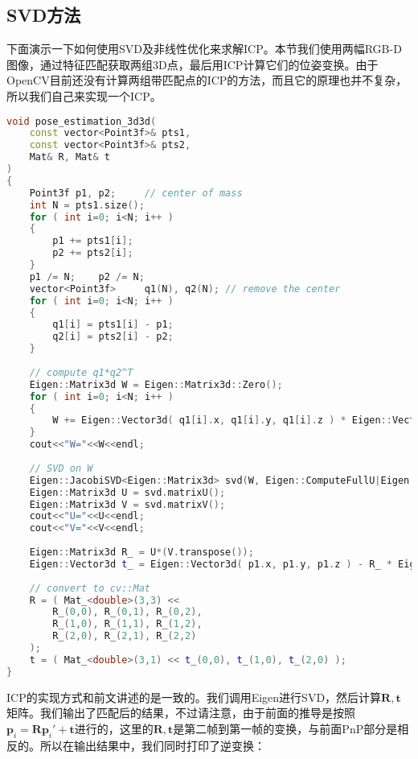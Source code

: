 \subsection{SVD方法}
下面演示一下如何使用SVD及非线性优化来求解ICP。本节我们使用两幅RGB-D图像，通过特征匹配获取两组3D点，最后用ICP计算它们的位姿变换。由于OpenCV目前还没有计算两组带匹配点的ICP的方法，而且它的原理也并不复杂，所以我们自己来实现一个ICP。

\begin{lstlisting}[language=c++,caption=slambook/ch7/pose\_estimation\_3d3d.cpp（片段）]
void pose_estimation_3d3d( 
	const vector<Point3f>& pts1, 
	const vector<Point3f>& pts2, 
	Mat& R, Mat& t
)
{
	Point3f p1, p2;     // center of mass
	int N = pts1.size();
	for ( int i=0; i<N; i++ )
	{
		p1 += pts1[i];
		p2 += pts2[i];
	}
	p1 /= N;    p2 /= N;
	vector<Point3f>     q1(N), q2(N); // remove the center
	for ( int i=0; i<N; i++ )
	{
		q1[i] = pts1[i] - p1;
		q2[i] = pts2[i] - p2;
	}
	
	// compute q1*q2^T
	Eigen::Matrix3d W = Eigen::Matrix3d::Zero();
	for ( int i=0; i<N; i++ )
	{
		W += Eigen::Vector3d( q1[i].x, q1[i].y, q1[i].z ) * Eigen::Vector3d( q2[i].x, q2[i].y, q2[i].z ).transpose();
	}
	cout<<"W="<<W<<endl;
	
	// SVD on W
	Eigen::JacobiSVD<Eigen::Matrix3d> svd(W, Eigen::ComputeFullU|Eigen::ComputeFullV);
	Eigen::Matrix3d U = svd.matrixU();
	Eigen::Matrix3d V = svd.matrixV();
	cout<<"U="<<U<<endl;
	cout<<"V="<<V<<endl;
	
	Eigen::Matrix3d R_ = U*(V.transpose());
	Eigen::Vector3d t_ = Eigen::Vector3d( p1.x, p1.y, p1.z ) - R_ * Eigen::Vector3d( p2.x, p2.y, p2.z );
	
	// convert to cv::Mat
	R = ( Mat_<double>(3,3) << 
		R_(0,0), R_(0,1), R_(0,2), 
		R_(1,0), R_(1,1), R_(1,2), 
		R_(2,0), R_(2,1), R_(2,2) 
	);
	t = ( Mat_<double>(3,1) << t_(0,0), t_(1,0), t_(2,0) );
}
\end{lstlisting}

ICP的实现方式和前文讲述的是一致的。我们调用Eigen进行SVD，然后计算$\bm{R}, \bm{t}$矩阵。我们输出了匹配后的结果，不过请注意，由于前面的推导是按照$\bm{p}_i = \bm{R} \bm{p}_i' + \bm{t}$进行的，这里的$\bm{R}, \bm{t}$是第二帧到第一帧的变换，与前面PnP部分是相反的。所以在输出结果中，我们同时打印了逆变换：

